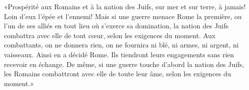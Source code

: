 «Prospérité aux Romains et à la nation des Juifs, sur mer et sur terre, à jamais!
	Loin d’eux l’épée et l’ennemi!
Mais si une guerre menace Rome la première,
	ou l’un de ses alliés en tout lieu où s’exerce sa domination,
	la nation des Juifs combattra avec elle de tout cœur, selon les exigences du moment.
Aux combattants, on ne donnera rien,
	on ne fournira ni blé, ni armes, ni argent, ni vaisseaux.
	Ainsi en a décidé Rome.
Ils tiendront leurs engagements sans rien recevoir en échange.
De même, si une guerre touche d’abord la nation des Juifs,
	les Romains combattront avec elle de toute leur âme, selon les exigences du moment.»
